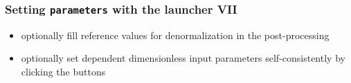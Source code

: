 \documentclass[9pt]{beamer}
\begin{document}
{
\begin{frame}[fragile]
  \frametitle{Setting {\tt parameters} with the launcher VII}

\vspace{5.25cm}

\begin{block}{}
\begin{itemize}
\item optionally fill reference values for denormalization in the post-processing
\item optionally set dependent dimensionless input parameters self-consistently by clicking the buttons
\end{itemize}
\end{block}

\end{frame}
}

\end{document}
